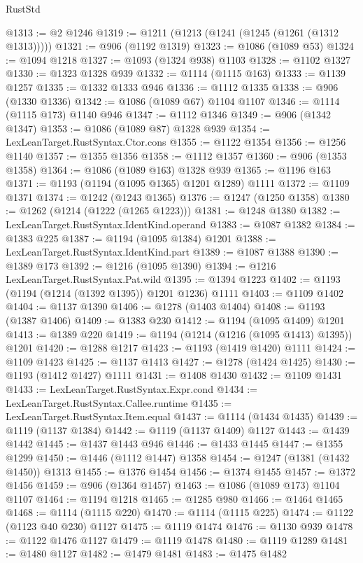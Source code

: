 \begin{lexlean}{RustStd}
\begin{coremodule}
{\begin{coremodule}
{{{{{{{{{{{{{{{{{{{{{{{{{{{{{{{@1313 := @2 @1246
@1319 := @1211 (@1213 (@1241 (@1245 (@1261 (@1312 @1313)))))
@1321 := @906 (@1192 @1319)
@1323 := @1086 (@1089 @53)
@1324 := @1094 @1218
@1327 := @1093 (@1324 @938) @1103
@1328 := @1102 @1327
@1330 := @1323 @1328 @939
@1332 := @1114 (@1115 @163)
@1333 := @1139 @1257
@1335 := @1332 @1333 @946
@1336 := @1112 @1335
@1338 := @906 (@1330 @1336)
@1342 := @1086 (@1089 @67) @1104 @1107
@1346 := @1114 (@1115 @173) @1140 @946
@1347 := @1112 @1346
@1349 := @906 (@1342 @1347)
@1353 := @1086 (@1089 @87) @1328 @939
@1354 := LexLeanTarget.RustSyntax.Ctor.cons
@1355 := @1122 @1354
@1356 := @1256 @1140
@1357 := @1355 @1356
@1358 := @1112 @1357
@1360 := @906 (@1353 @1358)
@1364 := @1086 (@1089 @163) @1328 @939
@1365 := @1196 @163
@1371 := @1193 (@1194 (@1095 @1365) @1201 @1289) @1111
@1372 := @1109 @1371
@1374 := @1242 (@1243 @1365)
@1376 := @1247 (@1250 @1358)
@1380 := @1262 (@1214 (@1222 (@1265 @1223)))
@1381 := @1248 @1380
@1382 := LexLeanTarget.RustSyntax.IdentKind.operand
@1383 := @1087 @1382
@1384 := @1383 @225
@1387 := @1194 (@1095 @1384) @1201
@1388 := LexLeanTarget.RustSyntax.IdentKind.part
@1389 := @1087 @1388
@1390 := @1389 @173
@1392 := @1216 (@1095 @1390)
@1394 := @1216 LexLeanTarget.RustSyntax.Pat.wild
@1395 := @1394 @1223
@1402 := @1193 (@1194 (@1214 (@1392 @1395)) @1201 @1236) @1111
@1403 := @1109 @1402
@1404 := @1137 @1390
@1406 := @1278 (@1403 @1404)
@1408 := @1193 (@1387 @1406)
@1409 := @1383 @230
@1412 := @1194 (@1095 @1409) @1201
@1413 := @1389 @220
@1419 := @1194 (@1214 (@1216 (@1095 @1413) @1395)) @1201
@1420 := @1288 @1217
@1423 := @1193 (@1419 @1420) @1111
@1424 := @1109 @1423
@1425 := @1137 @1413
@1427 := @1278 (@1424 @1425)
@1430 := @1193 (@1412 @1427) @1111
@1431 := @1408 @1430
@1432 := @1109 @1431
@1433 := LexLeanTarget.RustSyntax.Expr.cond
@1434 := LexLeanTarget.RustSyntax.Callee.runtime
@1435 := LexLeanTarget.RustSyntax.Item.equal
@1437 := @1114 (@1434 @1435)
@1439 := @1119 (@1137 @1384)
@1442 := @1119 (@1137 @1409) @1127
@1443 := @1439 @1442
@1445 := @1437 @1443 @946
@1446 := @1433 @1445
@1447 := @1355 @1299
@1450 := @1446 (@1112 @1447) @1358
@1454 := @1247 (@1381 (@1432 @1450)) @1313
@1455 := @1376 @1454
@1456 := @1374 @1455
@1457 := @1372 @1456
@1459 := @906 (@1364 @1457)
@1463 := @1086 (@1089 @173) @1104 @1107
@1464 := @1194 @1218
@1465 := @1285 @980
@1466 := @1464 @1465
@1468 := @1114 (@1115 @220)
@1470 := @1114 (@1115 @225)
@1474 := @1122 (@1123 @40 @230) @1127
@1475 := @1119 @1474
@1476 := @1130 @939
@1478 := @1122 @1476 @1127
@1479 := @1119 @1478
@1480 := @1119 @1289
@1481 := @1480 @1127
@1482 := @1479 @1481
@1483 := @1475 @1482
}}}}}}}}}}}}}}}}}}}}}}}}}}}}}}}
\end{coremodule}}
\end{coremodule}
\end{lexlean}

